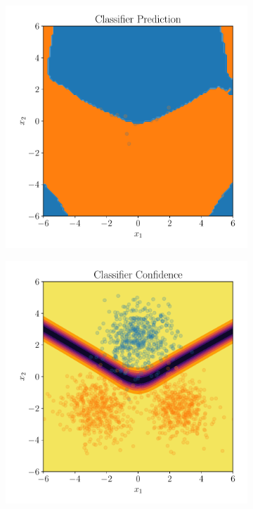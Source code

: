 \begin{figure}[htpb]
\begin{subfigure}[]{0.4\textwidth}
        \includegraphics[width=\linewidth]{figures/toy_example/gaussian_mixture/classifier_kl_class.pdf}
        \caption{}
        \label{fig:}
    \end{subfigure}
    \begin{subfigure}[]{0.4\textwidth}
        \centering
    \includegraphics[width=\linewidth]{figures/toy_example/gaussian_mixture/classifier_confidence.pdf}

\end{subfigure}
\end{figure}
